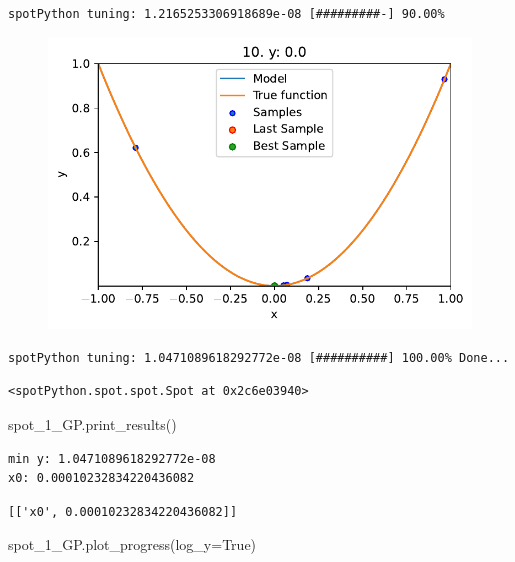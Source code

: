 \documentclass[
  letterpaper,
  DIV=11,
  numbers=noendperiod]{scrreprt}
\newenvironment{Shaded}{\begin{snugshade}}{\end{snugshade}}
\newcommand{\NormalTok}[1]{\textcolor[rgb]{0.00,0.23,0.31}{#1}}
\newcommand{\OperatorTok}[1]{\textcolor[rgb]{0.37,0.37,0.37}{#1}}
\newcommand{\VariableTok}[1]{\textcolor[rgb]{0.07,0.07,0.07}{#1}}
\begin{document}
\begin{verbatim}
spotPython tuning: 1.2165253306918689e-08 [#########-] 90.00% 
\end{verbatim}

\begin{figure}[H]

{\centering \includegraphics{04_spot_sklearn_surrogate_files/figure-pdf/cell-25-output-14.pdf}

}

\end{figure}

\begin{verbatim}
spotPython tuning: 1.0471089618292772e-08 [##########] 100.00% Done...
\end{verbatim}

\begin{verbatim}
<spotPython.spot.spot.Spot at 0x2c6e03940>
\end{verbatim}

\begin{Shaded}
\begin{Highlighting}[]
\NormalTok{spot\_1\_GP.print\_results()}
\end{Highlighting}
\end{Shaded}

\begin{verbatim}
min y: 1.0471089618292772e-08
x0: 0.00010232834220436082
\end{verbatim}

\begin{verbatim}
[['x0', 0.00010232834220436082]]
\end{verbatim}

\begin{Shaded}
\begin{Highlighting}[]
\NormalTok{spot\_1\_GP.plot\_progress(log\_y}\OperatorTok{=}\VariableTok{True}\NormalTok{)}
\end{Highlighting}
\end{Shaded}
\end{document}
